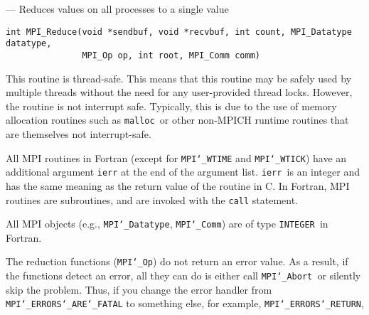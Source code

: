 \startmanpage
{}
--- Reduces values on all processes to a single value 
\startvb\begin{verbatim}
int MPI_Reduce(void *sendbuf, void *recvbuf, int count, MPI_Datatype datatype, 
               MPI_Op op, int root, MPI_Comm comm)

\end{verbatim}
\endvb

\par
{}
\par
{}
\par
This routine is thread-safe.  This means that this routine may be
safely used by multiple threads without the need for any user-provided
thread locks.  However, the routine is not interrupt safe.  Typically,
this is due to the use of memory allocation routines such as {\tt malloc
}or other non-MPICH runtime routines that are themselves not interrupt-safe.
\par
{}
All MPI routines in Fortran (except for {\tt MPI{\tt \char`\_}WTIME} and {\tt MPI{\tt \char`\_}WTICK}) have
an additional argument {\tt ierr} at the end of the argument list.  {\tt ierr
}is an integer and has the same meaning as the return value of the routine
in C.  In Fortran, MPI routines are subroutines, and are invoked with the
{\tt call} statement.
\par
All MPI objects (e.g., {\tt MPI{\tt \char`\_}Datatype}, {\tt MPI{\tt \char`\_}Comm}) are of type {\tt INTEGER
}in Fortran.
\par
{}
\par
The reduction functions ({\tt MPI{\tt \char`\_}Op}) do not return an error value.  As a result,
if the functions detect an error, all they can do is either call {\tt MPI{\tt \char`\_}Abort
}or silently skip the problem.  Thus, if you change the error handler from
{\tt MPI{\tt \char`\_}ERRORS{\tt \char`\_}ARE{\tt \char`\_}FATAL} to something else, for example, {\tt MPI{\tt \char`\_}ERRORS{\tt \char`\_}RETURN},
